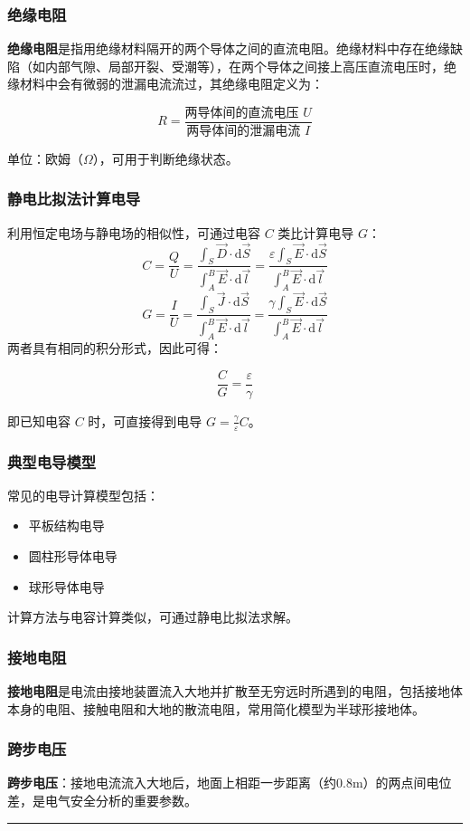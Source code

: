 \subsubsection{绝缘电阻}
\textbf{绝缘电阻}是指用绝缘材料隔开的两个导体之间的直流电阻。绝缘材料中存在绝缘缺陷（如内部气隙、局部开裂、受潮等），在两个导体之间接上高压直流电压时，绝缘材料中会有微弱的泄漏电流流过，其绝缘电阻定义为：
\begin{formulaBox}
\[
R = \frac{\text{两导体间的直流电压 } U}{\text{两导体间的泄漏电流 } I}
\]
\end{formulaBox}
单位：欧姆（$\Omega$），可用于判断绝缘状态。

\subsubsection{静电比拟法计算电导}
利用恒定电场与静电场的相似性，可通过电容 $C$ 类比计算电导 $G$：
\[
C = \frac{Q}{U} = \frac{\int_S \vec{D} \cdot \mathrm{d}\vec{S}}{\int_A^B \vec{E} \cdot \mathrm{d}\vec{l}} = \frac{\varepsilon \int_S \vec{E} \cdot \mathrm{d}\vec{S}}{\int_A^B \vec{E} \cdot \mathrm{d}\vec{l}}
\]
\[
G = \frac{I}{U} = \frac{\int_S \vec{J} \cdot \mathrm{d}\vec{S}}{\int_A^B \vec{E} \cdot \mathrm{d}\vec{l}} = \frac{\gamma \int_S \vec{E} \cdot \mathrm{d}\vec{S}}{\int_A^B \vec{E} \cdot \mathrm{d}\vec{l}}
\]
两者具有相同的积分形式，因此可得：
\begin{formulaBox}
\[
\frac{C}{G} = \frac{\varepsilon}{\gamma}
\]
\end{formulaBox}
即已知电容 $C$ 时，可直接得到电导 $G = \frac{\gamma}{\varepsilon} C$。

\subsubsection{典型电导模型}
常见的电导计算模型包括：
\begin{itemize}
    \item 平板结构电导
    \item 圆柱形导体电导
    \item 球形导体电导
\end{itemize}
计算方法与电容计算类似，可通过静电比拟法求解。

\subsubsection{接地电阻}
\textbf{接地电阻}是电流由接地装置流入大地并扩散至无穷远时所遇到的电阻，包括接地体本身的电阻、接触电阻和大地的散流电阻，常用简化模型为半球形接地体。

\subsubsection{跨步电压}
\textbf{跨步电压}：接地电流流入大地后，地面上相距一步距离（约0.8m）的两点间电位差，是电气安全分析的重要参数。

\vspace{0.8cm}\hrule\vspace{0.8cm}